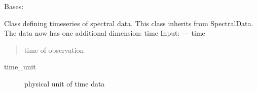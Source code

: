 \documentclass[a4paper,11pt,english]{sphinxmanual}
\begin{document}

\begin{fulllineitems}
\label{\detokenize{cascade.data_model:cascade.data_model.data_model.SpectralDataTimeSeries}}
Bases: {\hyperref[\detokenize{cascade.data_model:cascade.data_model.data_model.SpectralData}]{}}

Class defining timeseries of spectral data. This class inherits from
SpectralData. The data now has one additional dimension: time
Input:
—\textendash{}
time
\begin{quote}

time of observation
\end{quote}
\begin{description}
\item[{time\_unit}] \leavevmode
physical unit of time data

\end{description}

\begin{fulllineitems}
\label{\detokenize{cascade.data_model:cascade.data_model.data_model.SpectralDataTimeSeries.time}}
\end{fulllineitems}


\begin{fulllineitems}
\label{\detokenize{cascade.data_model:cascade.data_model.data_model.SpectralDataTimeSeries.time_unit}}
\end{fulllineitems}


\end{fulllineitems}
\end{document}

